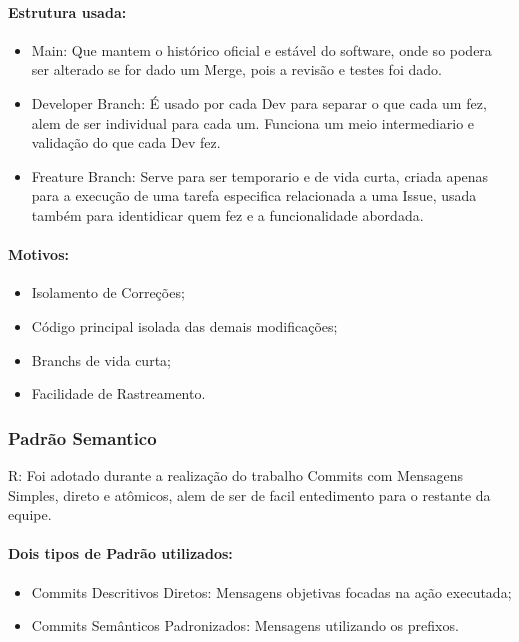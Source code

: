 \documentclass[12pt]{article}
\begin{document}
     \paragraph{Estrutura usada:}
     \begin{itemize}
        \item Main: Que mantem o histórico oficial e estável do software, onde so podera ser alterado se for dado um Merge, pois a revisão e testes foi dado.
        \item Developer Branch: É usado por cada Dev para separar o que cada um fez, alem de ser individual para cada um. Funciona um meio intermediario e validação do que cada Dev fez.
        \item Freature Branch: Serve para ser temporario e de vida curta, criada apenas para a execução de uma tarefa especifica relacionada a uma Issue, usada também para identidicar quem fez e a funcionalidade abordada.
     \end{itemize}

    \paragraph{Motivos:}
    \begin{itemize}
        \item Isolamento de Correções;
        \item Código principal isolada das demais modificações;
        \item Branchs de vida curta;
        \item Facilidade de Rastreamento.
    \end{itemize}
     
    \subsubsection{Padrão Semantico}
     R: Foi adotado durante a realização do trabalho Commits com Mensagens Simples, direto e atômicos, alem de ser de facil entedimento para o restante da equipe.

     \paragraph{Dois tipos de Padrão utilizados:}
     \begin{itemize}
          \item Commits Descritivos Diretos: Mensagens objetivas focadas na ação executada;
          \item Commits Semânticos Padronizados: Mensagens utilizando os prefixos. 
     \end{itemize}
\end{document}
